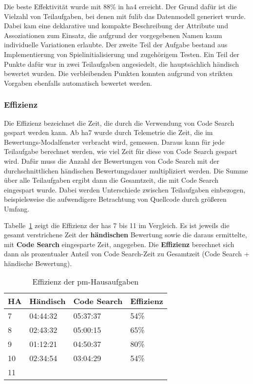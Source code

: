 Die beste Effektivität wurde mit 88\% in \ac{ha}4 erreicht.
Der Grund dafür ist die Vielzahl von Teilaufgaben, bei denen mit fulib das Datenmodell generiert wurde.
Dabei kam eine deklarative und kompakte Beschreibung der Attribute und Assoziationen zum Einsatz, die aufgrund der vorgegebenen Namen kaum individuelle Variationen erlaubte.
Der zweite Teil der Aufgabe bestand aus Implementierung von Spielinitialisierung und zugehörigem Testen.
Ein Teil der Punkte dafür war in zwei Teilaufgaben angesiedelt, die hauptsächlich händisch bewertet wurden.
Die verbleibenden Punkten konnten aufgrund von strikten Vorgaben ebenfalls automatisch bewertet werden.

\subsubsection{Effizienz}

Die Effizienz bezeichnet die Zeit, die durch die Verwendung von Code Search gespart werden kann.
Ab \ac{ha}7 wurde durch Telemetrie die Zeit, die im Bewertungs-Modalfenster verbracht wird, gemessen.
Daraus kann für jede Teilaufgabe berechnet werden, wie viel Zeit für diese von Code Search gespart wird.
Dafür muss die Anzahl der Bewertungen von Code Search mit der durchschnittlichen händischen Bewertungsdauer multipliziert werden.
Die Summe über alle Teilaufgaben ergibt dann die Gesamtzeit, die mit Code Search eingespart wurde.
Dabei werden Unterschiede zwischen Teilaufgaben einbezogen, beispielsweise die aufwendigere Betrachtung von Quellcode durch größeren Umfang.

Tabelle~\ref{tbl:pm-efficiency} zeigt die Effizienz der \acp{ha} 7 bis 11 im Vergleich.
Es ist jeweils die gesamt verstrichene Zeit der \textbf{händischen} Bewertung sowie die daraus ermittelte, mit \textbf{Code Search} eingesparte Zeit, angegeben.
Die \textbf{Effizienz} berechnet sich dann als prozentualer Anteil von Code Search-Zeit zu Gesamtzeit (Code Search + händische Bewertung).

\begin{table}
    \centering
    \caption{Effizienz der \ac{pm}-Hausaufgaben}
    \begin{tabular}{|l|l|l|l|}
    \hline
        HA  & Händisch & Code Search & Effizienz \\ \hline
        7   & 04:44:32 & 05:37:37    & 54\%  \\ \hline
        8   & 02:43:32 & 05:00:15    & 65\%  \\ \hline
        9   & 01:12:21 & 04:50:37    & 80\%  \\ \hline
        10  & 02:34:54 & 03:04:29    & 54\%  \\ \hline
        11  & \multicolumn{3}{c}{\todo{}}
    \end{tabular}
    \label{tbl:pm-efficiency}
\end{table}

